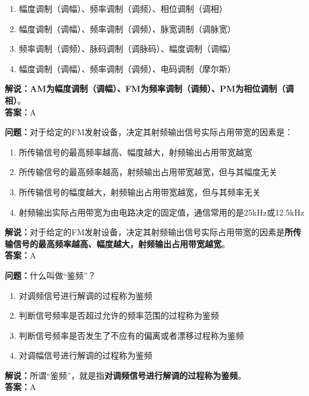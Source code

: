 \begin{enumerate}[label=\Alph*), leftmargin=1cm]
	\item 幅度调制（调幅）、频率调制（调频）、相位调制（调相）
	\item 幅度调制（调幅）、频率调制（调频）、脉宽调制（调脉宽）
	\item 频率调制（调频）、脉码调制（调脉码）、幅度调制（调幅）
	\item 幅度调制（调幅）、频率调制（调频）、电码调制（摩尔斯）
\end{enumerate}

\textbf{解说：}\textbf{AM为幅度调制（调幅）、FM为频率调制（调频）、PM为相位调制（调相）}。\\\textbf{答案：}A%



\textbf{问题：}对于给定的FM发射设备，决定其射频输出信号实际占用带宽的因素是：

\begin{enumerate}[label=\Alph*), leftmargin=1cm]
	\item 所传输信号的最高频率越高、幅度越大，射频输出占用带宽越宽
	\item 所传输信号的最高频率越高，射频输出占用带宽越宽，但与其幅度无关
	\item 所传输信号的幅度越大，射频输出占用带宽越宽，但与其频率无关
	\item 射频输出实际占用带宽为由电路决定的固定值，通信常用的是25kHz或12.5kHz
\end{enumerate}

\textbf{解说：}对于给定的FM发射设备，决定其射频输出信号实际占用带宽的因素是\textbf{所传输信号的最高频率越高、幅度越大，射频输出占用带宽越宽}。\\\textbf{答案：}A%



\textbf{问题：}什么叫做“鉴频”？

\begin{enumerate}[label=\Alph*), leftmargin=1cm]
	\item 对调频信号进行解调的过程称为鉴频
	\item 判断信号频率是否超过允许的频率范围的过程称为鉴频
	\item 判断信号频率是否发生了不应有的偏离或者漂移过程称为鉴频
	\item 对调幅信号进行解调的过程称为鉴频
\end{enumerate}

\textbf{解说：}所谓“鉴频”，就是指\textbf{对调频信号进行解调的过程称为鉴频}。\\\textbf{答案：}A%



